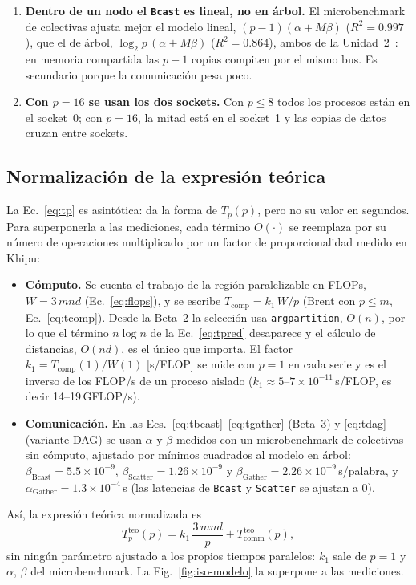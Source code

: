 \documentclass[11pt,a4paper]{article}
\newcommand{\ntr}{n}   %
\newcommand{\mte}{m}   %
\newcommand{\Tcomp}{T_{\text{comp}}}
\newcommand{\Tcomm}{T_{\text{comm}}}
\begin{document}
\begin{enumerate}
        contadores de hardware.
  \item \textbf{Dentro de un nodo el \texttt{Bcast} es lineal, no en árbol.} El microbenchmark de
        colectivas ajusta mejor el modelo lineal, $(p-1)(\alpha+M\beta)$ ($R^2=0.997$), que el de
        árbol, $\log_2p\,(\alpha+M\beta)$ ($R^2=0.864$), ambos de la Unidad~2~\cite{fiestasU2}: en
        memoria compartida las $p-1$ copias compiten por el mismo bus. Es secundario porque la
        comunicación pesa poco.
  \item \textbf{Con $p=16$ se usan los dos sockets.} Con $p\le8$ todos los procesos están en el
        socket~0; con $p=16$, la mitad está en el socket~1 y las copias de datos cruzan entre sockets.
\end{enumerate}

\subsection{Normalización de la expresión teórica}
\label{sec:normalizacion}
La Ec.~\eqref{eq:tp} es asintótica: da la forma de $T_p(p)$, pero no su valor en segundos. Para
superponerla a las mediciones, cada término $O(\cdot)$ se reemplaza por su número de operaciones
multiplicado por un factor de proporcionalidad medido en Khipu:
\begin{itemize}
  \item \textbf{Cómputo.} Se cuenta el trabajo de la región paralelizable en FLOPs,
        $W=3\,\mte\ntr d$ (Ec.~\eqref{eq:flops}), y se escribe $\Tcomp=k_1\,W/p$ (Brent con
        $p\le\mte$, Ec.~\eqref{eq:tcomp}). Desde la Beta~2 la selección usa \texttt{argpartition},
        $O(\ntr)$, por lo que el término $\ntr\log\ntr$ de la Ec.~\eqref{eq:tpred} desaparece y el
        cálculo de distancias, $O(\ntr d)$, es el único que importa. El factor
        $k_1=\Tcomp(1)/W(1)$ [s/FLOP] se mide con $p=1$ en cada serie y es el inverso de los FLOP/s de
        un proceso aislado ($k_1\approx5$--$7\times10^{-11}$\,s/FLOP, es decir 14--19\,GFLOP/s).
  \item \textbf{Comunicación.} En las Ecs.~\eqref{eq:tbcast}--\eqref{eq:tgather} (Beta~3) y
        \eqref{eq:tdag} (variante DAG) se usan $\alpha$ y $\beta$ medidos con un microbenchmark de
        colectivas sin cómputo, ajustado por mínimos cuadrados al modelo en árbol:
        $\beta_{\text{Bcast}}=5.5\times10^{-9}$, $\beta_{\text{Scatter}}=1.26\times10^{-9}$ y
        $\beta_{\text{Gather}}=2.26\times10^{-9}$\,s/palabra, y $\alpha_{\text{Gather}}=1.3\times10^{-4}$\,s
        (las latencias de \texttt{Bcast} y \texttt{Scatter} se ajustan a 0).
\end{itemize}
Así, la expresión teórica normalizada es
\begin{equation}
  T_p^{\text{teo}}(p)=k_1\,\frac{3\,\mte\ntr d}{p}+\Tcomm^{\text{teo}}(p),
  \label{eq:tp-norm}
\end{equation}
sin ningún parámetro ajustado a los propios tiempos paralelos: $k_1$ sale de $p=1$ y $\alpha$,
$\beta$ del microbenchmark. La Fig.~\ref{fig:iso-modelo} la superpone a las mediciones.
\end{document}
